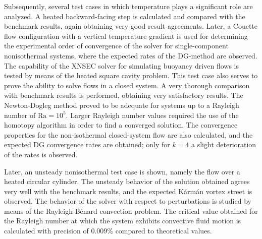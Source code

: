 Subsequently, several test cases in which temperature plays a significant role are analyzed. A heated backward-facing step is calculated and compared with the benchmark results, again obtaining very good result agreements. Later, a Couette flow configuration with a vertical temperature gradient is used for determining the experimental order of convergence of the solver for single-component nonisothermal systems, where the expected rates of the DG-method are observed. The capability of the XNSEC solver for simulating buoyancy driven flows is tested by means of the heated square cavity problem. This test case also serves to prove the ability to solve flows in a closed system. A very thorough comparison with benchmark results is performed, obtaining very satisfactory results. The Newton-Dogleg method proved to be adequate for systems up to a Rayleigh number of $\text{Ra} = 10^5$. Larger Rayleigh number values required the use of the homotopy algorithm in order to find a converged solution. The convergence properties for the non-isothermal closed-system flow are also calculated, and the expected DG convergence rates are obtained; only for $k=4$ a slight deterioration of the rates is observed.

Later, an unsteady nonisothermal test case is shown, namely the flow over a heated circular cylinder. The unsteady behavior of the solution obtained agrees very well with the benchmark results, and the expected Kármán vortex street is observed. The behavior of the solver with respect to perturbations is studied by means of the Rayleigh-Bénard convection problem. The critical value obtained for the Rayleigh number at which the system exhibits convective fluid motion is calculated with precision of $0.009\%$ compared to theoretical values. 

